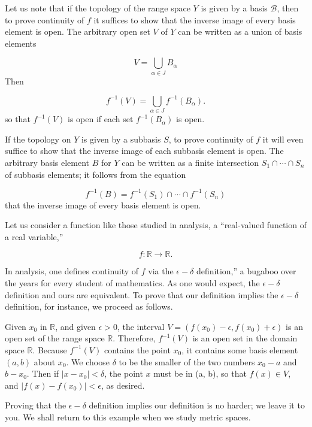 Let us note that if the topology of the range space \(Y\) is given by a basis \(\mathcal{B}\), then to prove continuity of \(f\) it suffices to show that the inverse image of every basis element is open. The arbitrary open set \(V\) of \(Y\) can be written as a union of basis elements

\[
V = \mathop{\bigcup }\limits_{{\alpha \in J}}B_{\alpha }
\]
Then

\[
f^{-1}( V) = \mathop{\bigcup }\limits_{{\alpha \in J}}f^{-1}( B_{\alpha }).
\]
so that \(f^{-1}( V)\) is open if each set \(f^{-1}( B_{\alpha })\) is open.

If the topology on \(Y\) is given by a subbasis \(S\), to prove continuity of \(f\) it will even suffice to show that the inverse image of each subbasis element is open. The arbitrary basis element \(B\) for \(Y\) can be written as a finite intersection \(S_{1} \cap \cdots \cap {S}_{n}\) of subbasis elements; it follows from the equation

\[
f^{-1}( B) = f^{-1}( S_{1}) \cap \cdots \cap {f}^{-1}( S_{n})
\]
that the inverse image of every basis element is open.

\begin{centeredblock}
\begin{example}
\label{ex:\thesection.\theexample}
 Let us consider a function like those studied in analysis, a ``real-valued function of a real variable,''

 \[
 f : \mathbb{R} \rightarrow \mathbb{R}\text{.}
 \]

 In analysis, one defines continuity of \(f\) via the \(\epsilon - \delta\) definition,'' a bugaboo over the years for every student of mathematics. As one would expect, the \(\epsilon - \delta\) definition and ours are equivalent. To prove that our definition implies the \(\epsilon - \delta\) definition, for instance, we proceed as follows.

 Given \(x_{0}\) in \(\mathbb{R}\), and given \(\epsilon > 0\), the interval \(V = ( {f( x_{0}) - \epsilon,f( x_{0}) + \epsilon })\) is an open set of the range space \(\mathbb{R}\). Therefore, \(f^{-1}( V)\) is an open set in the domain space \(\mathbb{R}\). Because \(f^{-1}( V)\) contains the point \(x_{0}\), it contains some basis element \((a, b)\) about \(x_{0}\). We choose \(\delta\) to be the smaller of the two numbers \(x_{0} - a\) and \(b - x_{0}\). Then if \(| {x - x_{0}}| < \delta\), the point \(x\) must be in (a, b), so that \(f(x) \in V\), and \(| {f(x) - f( x_{0}) }| < \epsilon\), as desired.

 Proving that the \(\epsilon - \delta\) definition implies our definition is no harder; we leave it to you. We shall return to this example when we study metric spaces.
\end{example}
\end{centeredblock}

